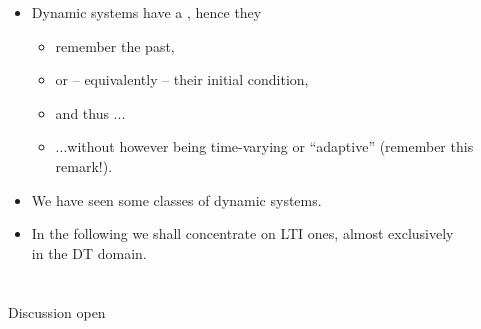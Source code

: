 \begin{frame}
\myPause
 \begin{itemize}[<+-| alert@+>]
 \item Dynamic systems have a , hence they
       \begin{itemize}[<+-| alert@+>]
       \item remember the past,
       \item or -- equivalently -- their initial condition,
       \item and thus ...
       \item ...without however being time-varying or ``adaptive'' (remember this remark!).
       \end{itemize}
 \item We have seen some classes of dynamic systems.
 \item In the following we shall concentrate on LTI ones, almost exclusively\\
       in the DT domain. 
 \end{itemize}
\end{frame}

\section{}
{
\begin{frame}[noframenumbering]
 \vspace{20mm}\Huge{Discussion open}
\end{frame}
}

